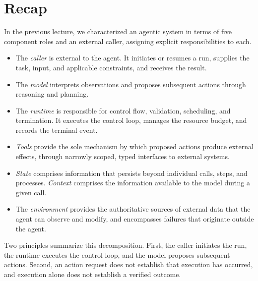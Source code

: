 \section*{Recap}

In the previous lecture, we characterized an agentic system in terms of five component roles
and an external caller, assigning explicit responsibilities to each.
\begin{itemize}
  \item The \emph{caller} is external to the agent. It initiates or resumes a run, supplies
  the task, input, and applicable constraints, and receives the result.
  \item The \emph{model} interprets observations and proposes subsequent actions through
  reasoning and planning.
  \item The \emph{runtime} is responsible for control flow, validation, scheduling, and
  termination. It executes the control loop, manages the resource budget, and records the
  terminal event.
  \item \emph{Tools} provide the sole mechanism by which proposed actions produce external
  effects, through narrowly scoped, typed interfaces to external systems.
  \item \emph{State} comprises information that persists beyond individual calls, steps, and
  processes. \emph{Context} comprises the information available to the model during a given call.
  \item The \emph{environment} provides the authoritative sources of external data that the
  agent can observe and modify, and encompasses failures that originate outside the agent.
\end{itemize}
Two principles summarize this decomposition. First, the caller initiates the run, the runtime
executes the control loop, and the model proposes subsequent actions. Second, an action request
does not establish that execution has occurred, and execution alone does not establish a
verified outcome.

